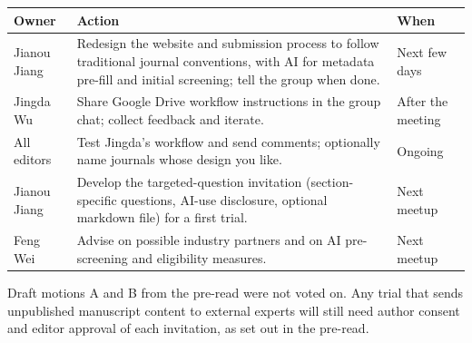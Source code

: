 \documentclass[11pt]{article}
\begin{document}
{\small\renewcommand{\arraystretch}{1.25}
\begin{longtable}{@{}p{3.1cm}p{8.3cm}p{2.7cm}@{}}
\toprule
\textbf{Owner} & \textbf{Action} & \textbf{When} \\
\midrule
\endhead
\bottomrule
\endlastfoot
Jianou Jiang & Redesign the website and submission process to follow traditional journal conventions, with AI for metadata pre-fill and initial screening; tell the group when done. & Next few days \\
Jingda Wu & Share Google Drive workflow instructions in the group chat; collect feedback and iterate. & After the meeting \\
All editors & Test Jingda's workflow and send comments; optionally name journals whose design you like. & Ongoing \\
Jianou Jiang & Develop the targeted-question invitation (section-specific questions, AI-use disclosure, optional markdown file) for a first trial. & Next meetup \\
Feng Wei & Advise on possible industry partners and on AI pre-screening and eligibility measures. & Next meetup \\
\end{longtable}}

{\small\color{ink2}Draft motions A and B from the pre-read were not voted on. Any trial that sends unpublished manuscript content to external experts will still need author consent and editor approval of each invitation, as set out in the pre-read.}
\end{document}
